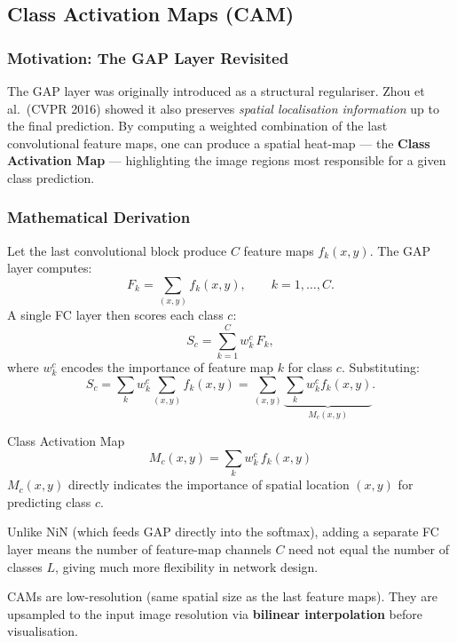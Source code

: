 \documentclass[11pt,a4paper]{article}
\newcommand{\term}[1]{\textcolor{DefGreen}{\textbf{#1}}\index{#1}}
\begin{document}
\subsection{Class Activation Maps (CAM)}
\label{sec:cam}

\subsubsection{Motivation: The GAP Layer Revisited}

The GAP layer was originally introduced as a structural regulariser. Zhou et al.\ (CVPR 2016) showed it also preserves \emph{spatial localisation information} up to the final prediction. By computing a weighted combination of the last convolutional feature maps, one can produce a spatial heat-map — the \term{Class Activation Map} — highlighting the image regions most responsible for a given class prediction.

\subsubsection{Mathematical Derivation}

Let the last convolutional block produce $C$ feature maps $f_k(x,y)$. The GAP layer computes:
\[
F_k = \sum_{(x,y)} f_k(x,y), \qquad k=1,\ldots,C.
\]
A single FC layer then scores each class $c$:
\[
S_c = \sum_{k=1}^{C} w_k^c \, F_k,
\]
where $w_k^c$ encodes the importance of feature map $k$ for class $c$. Substituting:
\[
S_c = \sum_k w_k^c \sum_{(x,y)} f_k(x,y) = \sum_{(x,y)} \underbrace{\sum_k w_k^c f_k(x,y)}_{M_c(x,y)}.
\]

\begin{defbox}{Class Activation Map}
\[
M_c(x,y) = \sum_k w_k^c \, f_k(x,y)
\]
$M_c(x,y)$ directly indicates the importance of spatial location $(x,y)$ for predicting class $c$.
\end{defbox}

\begin{notebox}
Unlike NiN (which feeds GAP directly into the softmax), adding a separate FC layer means the number of feature-map channels $C$ need not equal the number of classes $L$, giving much more flexibility in network design.
\end{notebox}

CAMs are low-resolution (same spatial size as the last feature maps). They are upsampled to the input image resolution via \textbf{bilinear interpolation} before visualisation.
\end{document}

